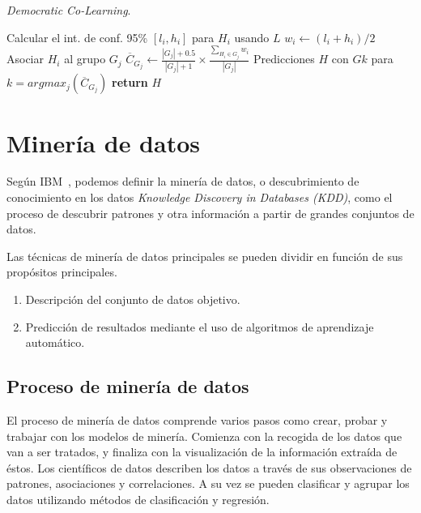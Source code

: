 \begin{algorithm}[h]
\caption{\textit{Democratic Co-Learning}.}\label{alg:Democratic-Co-2}
\begin{algorithmic}[1]
		\State Calcular el int. de conf. 95\% $\left[ l_i, h_i\right]$ para $H_i$ usando $L$
		\State $w_i \leftarrow \left( l_i + h_i\right)/2$
	\EndFor
				\State Asociar $H_i$ al grupo $G_j$
			\EndIf
		\EndFor
			\State $\overline{C}_{G_{j}} \leftarrow \frac{\left|G_j\right| + 0.5}{\left|G_j\right| + 1} \times \frac{\sum_{H_i\in G_j}w_i}{\left| G_j\right|}$
		\EndFor
	\EndFor
	\State Predicciones $H$ con $Gk$ para $k = argmax_j\left(\overline{C}_{G_{j}}\right)$
	\State \textbf{return} $H$
\EndProcedure
\end{algorithmic}
\end{algorithm}

\vfill
\section{Minería de datos}

Según IBM~\cite{IBM-WhatisDataMining}, podemos definir la minería de datos, o descubrimiento de conocimiento
en los datos \textit{Knowledge Discovery in Databases (KDD)}, como el proceso de descubrir patrones y otra
información a partir de grandes conjuntos de datos. 

Las técnicas de minería de datos principales se pueden dividir en función de sus propósitos principales.
\begin{enumerate}
    \item Descripción del conjunto de datos objetivo.
    \item Predicción de resultados mediante el uso de algoritmos de aprendizaje automático.
\end{enumerate}

\subsection{Proceso de minería de datos}
El proceso de minería de datos comprende varios pasos como crear, probar y trabajar con los modelos de minería. Comienza con la recogida de los datos que van a ser tratados, y finaliza con la visualización de la información extraída de éstos. 
Los científicos de datos describen los datos a través de sus observaciones de patrones, asociaciones y correlaciones. A su vez se pueden clasificar y agrupar los datos utilizando métodos de clasificación y regresión.

